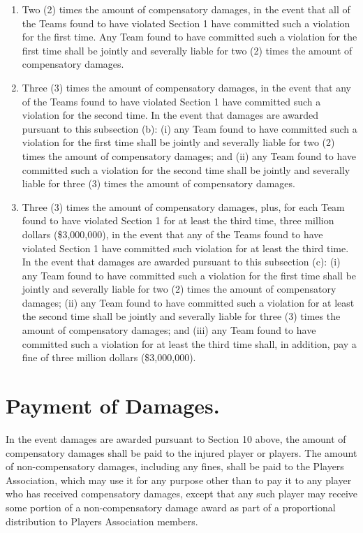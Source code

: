 \documentclass[
]{book}
\providecommand{\tightlist}{%
  \setlength{\itemsep}{0pt}\setlength{\parskip}{0pt}}
\begin{document}
\begin{enumerate}
\def\labelenumi{(\alph{enumi})}
\tightlist
\item
  Two (2) times the amount of compensatory damages, in the event that all of the Teams found to have violated Section 1 have committed such a violation for the first time. Any Team found to have committed such a violation for the first time shall be jointly and severally liable for two (2) times the amount of compensatory damages.
\item
  Three (3) times the amount of compensatory damages, in the event that any of the Teams found to have violated Section 1 have committed such a violation for the second time. In the event that damages are awarded pursuant to this subsection (b): (i) any Team found to have committed such a violation for the first time shall be jointly and severally liable for two (2) times the amount of compensatory damages; and (ii) any Team found to have committed such a violation for the second time shall be jointly and severally liable for three (3) times the amount of compensatory damages.
\item
  Three (3) times the amount of compensatory damages, plus, for each Team found to have violated Section 1 for at least the third time, three million dollars (\$3,000,000), in the event that any of the Teams found to have violated Section 1 have committed such violation for at least the third time. In the event that damages are awarded pursuant to this subsection (c): (i) any Team found to have committed such a violation for the first time shall be jointly and severally liable for two (2) times the amount of compensatory damages; (ii) any Team found to have committed such a violation for at least the second time shall be jointly and severally liable for three (3) times the amount of compensatory damages; and (iii) any Team found to have committed such a violation for at least the third time shall, in addition, pay a fine of three million dollars (\$3,000,000).
\end{enumerate}

\hypertarget{payment-of-damages.}{%
\section{Payment of Damages.}\label{payment-of-damages.}}

In the event damages are awarded pursuant to Section 10 above, the amount of compensatory damages shall be paid to the injured player or players. The amount of non-compensatory damages, including any fines, shall be paid to the Players Association, which may use it for any purpose other than to pay it to any player who has received compensatory damages, except that any such player may receive some portion of a non-compensatory damage award as part of a proportional distribution to Players Association members.
\end{document}
